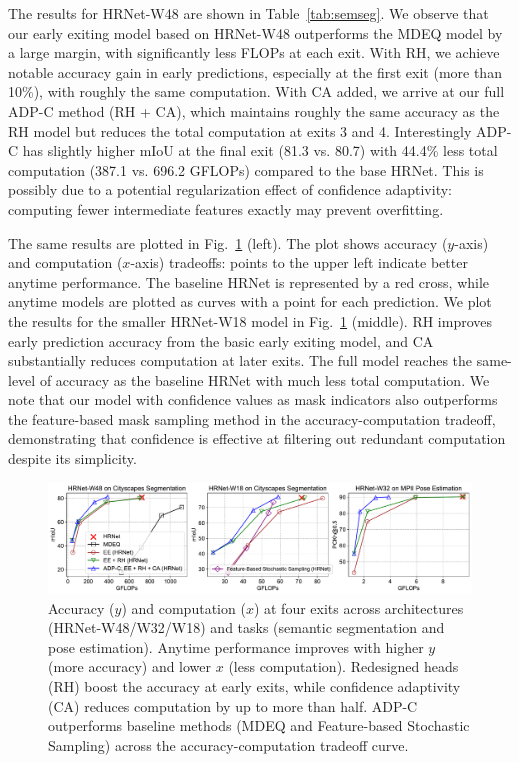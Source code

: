 \documentclass{article} %
\begin{document}
The results for HRNet-W48 are shown in Table~\ref{tab:semseg}.
We observe that our early exiting model based on HRNet-W48 outperforms the MDEQ model by a large margin, with significantly less FLOPs at each exit.
With RH, we achieve notable accuracy gain in early predictions, especially at the first exit (more than 10\%), with roughly the same computation.
With CA added, we arrive at our full ADP-C method (RH + CA), which maintains roughly the same accuracy as the RH model but reduces the total computation at exits 3 and 4.
Interestingly ADP-C has slightly higher mIoU at the final exit (81.3 vs. 80.7) with 44.4\% less total computation (387.1 vs. 696.2 GFLOPs) compared to the base HRNet.
This is possibly due to a potential regularization effect of confidence adaptivity: computing fewer intermediate features exactly may prevent overfitting.



The same results are plotted in Fig.~\ref{fig:result} (left).
The plot shows accuracy ($y$-axis) and computation ($x$-axis) tradeoffs: points to the upper left indicate better anytime performance.
The baseline HRNet is represented by a red cross, while anytime models are plotted as curves with a point for each prediction.
We plot the results for the smaller HRNet-W18 model in Fig.~\ref{fig:result} (middle).
RH improves early prediction accuracy from the basic early exiting model, and CA substantially reduces computation at later exits.
The full model reaches the same-level of accuracy as the baseline HRNet with much less total computation. We note that our model with confidence values as mask indicators also outperforms the feature-based mask sampling method in the accuracy-computation tradeoff, demonstrating that confidence is effective at filtering out redundant computation despite its simplicity.

\begin{figure}[htbp]
\vspace{0ex}
\includegraphics[width=\textwidth]{result_20220317.pdf}
\vspace{-4ex}
\caption{%
Accuracy ($y$) and computation ($x$) at four exits across architectures (HRNet-W48/W32/W18) and tasks (semantic segmentation and pose estimation).
Anytime performance improves with higher $y$ (more accuracy) and lower $x$ (less computation).
Redesigned heads (RH) boost the accuracy at early exits, while confidence adaptivity (CA) reduces computation by up to more than half.
ADP-C outperforms baseline methods (MDEQ and Feature-based Stochastic Sampling) across the accuracy-computation tradeoff curve.
}
\vspace{-2ex}
\label{fig:result}
\end{figure}
\end{document}
